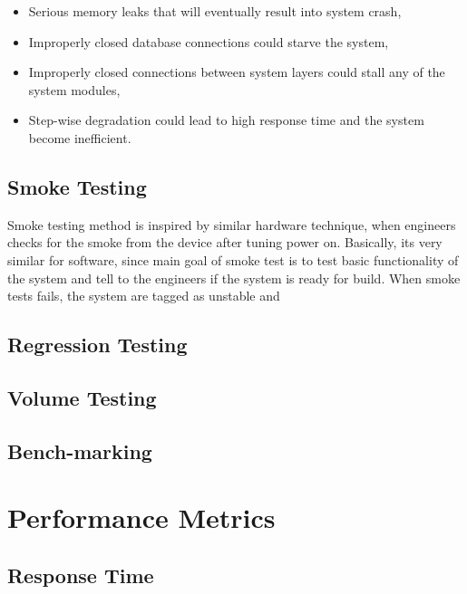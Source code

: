 \begin{itemize}
	\setlength\itemsep{0em}
	\item Serious memory leaks that will eventually result into system crash,
	\item Improperly closed database connections could starve the system,
	\item Improperly closed connections between system layers could stall any of the system modules,
	\item Step-wise degradation could lead to high response time and the system become inefficient.
\end{itemize}


\subsection*{Smoke Testing}
Smoke testing method is inspired by similar hardware technique, when engineers checks for the smoke from the device after tuning power on. Basically, its very similar for software, since main goal of smoke test is to test basic functionality of the system and tell to the engineers if the system is ready for build. When smoke tests fails, the system are tagged as unstable and 

\subsection*{Regression Testing}

\subsection*{Volume Testing}

\subsection*{Bench-marking}

\section{Performance Metrics}
\label{Performance Metrics}

\subsection{Response Time}

